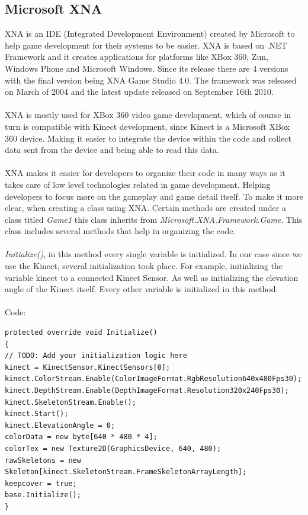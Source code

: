 \documentclass[11pt]{article} %
\begin{document}
\subsection{Microsoft XNA}
XNA is an IDE (Integrated Development Environment) created by Microsoft to help game development for their systems to be easier. XNA is based on .NET Framework and it creates applications for platforms like XBox 360, Zun, Windows Phone and Microsoft Windows. Since its release there are 4 versions with the final version being XNA Game Studio 4.0. The framework was released on March of 2004 and the latest update released on September 16th 2010.
\\
\\
XNA is mostly used for XBox 360 video game development, which of course in turn is compatible with Kinect development, since Kinect is a Microsoft XBox 360 device. Making it easier to integrate the device within the code and collect data sent from the device and being able to read this data.
\\
\\
XNA makes it easier for developers to organize their code in many ways as it takes care of low level technologies related in game development. Helping developers to focus more on the gameplay and game detail itself. To make it more clear, when creating a class using XNA. Certain methods are created under a class titled \emph{Game1} this class inherits from \emph{Microsoft.XNA.Framework.Game}. This class includes several methods that help in organizing the code.
\\
\\
\emph{Initialize()}, in this method every single variable is initialized. In our case since we use the Kinect, several initialization took place. For example, initializing the variable kinect to a connected Kinect Sensor. As well as initializing the elevation angle of the Kinect itself. Every other variable is initialized in this method.
\\
\\
Code:
\begin{verbatim}
protected override void Initialize()
{
// TODO: Add your initialization logic here
kinect = KinectSensor.KinectSensors[0];
kinect.ColorStream.Enable(ColorImageFormat.RgbResolution640x480Fps30);
kinect.DepthStream.Enable(DepthImageFormat.Resolution320x240Fps30);
kinect.SkeletonStream.Enable();
kinect.Start();
kinect.ElevationAngle = 0;
colorData = new byte[640 * 480 * 4];
colorTex = new Texture2D(GraphicsDevice, 640, 480);
rawSkeletons = new Skeleton[kinect.SkeletonStream.FrameSkeletonArrayLength];
keepcover = true;
base.Initialize();
}
\end{verbatim}
\end{document}
